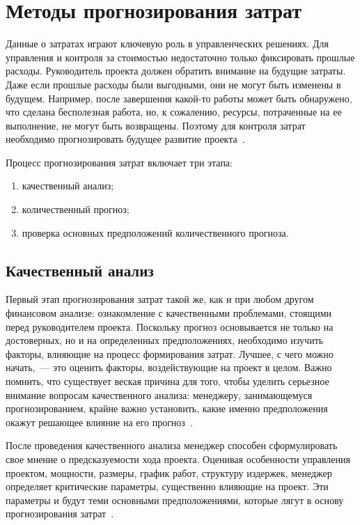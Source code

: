 \chapter{Методы прогнозирования затрат}

Данные о затратах играют ключевую роль в управленческих решениях. 
Для управления и контроля за стоимостью недостаточно только фиксировать прошлые расходы. 
Руководитель проекта должен обратить внимание на будущие затраты. 
Даже если прошлые расходы были выгодными, они не могут быть изменены в будущем. 
Например, после завершения какой-то работы может быть обнаружено, что сделана бесполезная работа, но, к сожалению, ресурсы, потраченные на ее выполнение, не могут быть возвращены. 
Поэтому для контроля затрат необходимо прогнозировать будущее развитие проекта~\cite{project2}.

Процесс прогнозирования затрат включает три этапа:
\begin{enumerate}
	\item качественный анализ;
	\item количественный прогноз;
	\item проверка основных предположений количественного прогноза.
\end{enumerate}

\section{Качественный анализ}

Первый этап прогнозирования затрат такой же, как и при любом другом финансовом анализе: ознакомление с качественными проблемами, стоящими перед руководителем проекта. 
Поскольку прогноз основывается не только на достоверных, но и на определенных предположениях, необходимо изучить факторы, влияющие на процесс формирования затрат. 
Лучшее, с чего можно начать,~--- это оценить факторы, воздействующие на проект в целом. 
Важно помнить, что существует веская причина для того, чтобы уделить серьезное внимание вопросам качественного анализа: менеджеру, занимающемуся прогнозированием, крайне важно установить, какие именно предположения окажут решающее влияние на его прогноз~\cite{project1}.

После проведения качественного анализа менеджер способен сформулировать свое мнение о предсказуемости хода проекта. 
Оценивая особенности управления проектом, мощности, размеры, график работ, структуру издержек, менеджер определяет критические параметры, существенно влияющие на проект. 
Эти параметры и будут теми основными предположениями, которые лягут в основу прогнозирования затрат~\cite{project2}.

